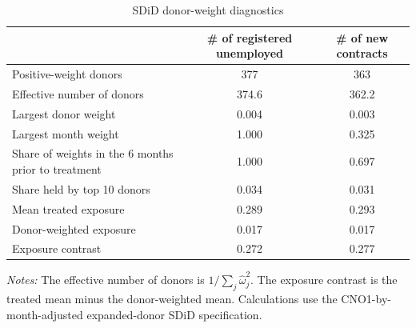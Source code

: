 \begin{table}[!htbp]
\centering
\caption{SDiD donor-weight diagnostics}
\label{tab:v1_sdid_weight_diagnostics}
\begin{threeparttable}
\small
\begin{tabular}{lcc}
\toprule
& \# of registered unemployed & \# of new contracts \\
\midrule
Positive-weight donors & 377 & 363 \\
Effective number of donors & 374.6 & 362.2 \\
Largest donor weight & 0.004 & 0.003 \\
Largest month weight & 1.000 & 0.325 \\
Share of weights in the 6 months prior to treatment & 1.000 & 0.697 \\
Share held by top 10 donors & 0.034 & 0.031 \\
Mean treated exposure & 0.289 & 0.293 \\
Donor-weighted exposure & 0.017 & 0.017 \\
Exposure contrast & 0.272 & 0.277 \\
\bottomrule
\end{tabular}
\begin{tablenotes}[flushleft]
\footnotesize
\item \emph{Notes:} The effective number of donors is \(1/\sum_j\widehat{\omega}_j^2\). The exposure contrast is the treated mean minus the donor-weighted mean. Calculations use the CNO1-by-month-adjusted expanded-donor SDiD specification.
\end{tablenotes}
\end{threeparttable}
\end{table}
